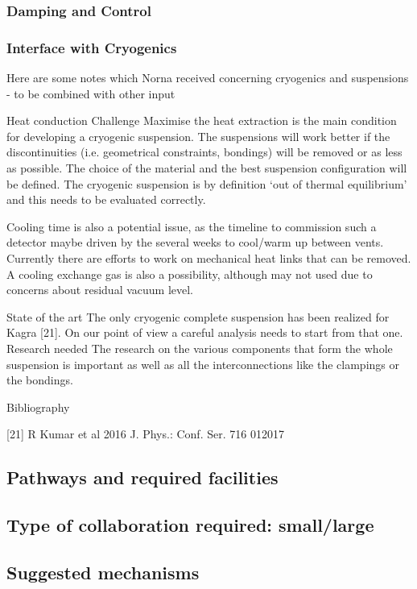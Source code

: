 \subsubsection{Damping and Control}
\subsubsection{Interface with Cryogenics}

Here are some notes which Norna received concerning cryogenics and suspensions - to be combined with other input

Heat conduction
Challenge
Maximise the heat extraction is the main condition for developing a cryogenic suspension. The suspensions will work better if the discontinuities (i.e. geometrical constraints, bondings) will be removed or as less as possible. The choice of the material and the best suspension configuration will be defined. The cryogenic suspension is by definition ‘out of thermal equilibrium’ and this needs to be evaluated correctly.

Cooling time is also a potential issue, as the timeline to commission such a detector maybe driven by the several weeks to cool/warm up between vents. Currently there are efforts to work on mechanical heat links that can be removed. A cooling exchange gas is also a possibility, although may not used due to concerns about residual vacuum level.

State of the art
The only cryogenic complete suspension has been realized for Kagra [21]. On our point of view a careful analysis needs to start from that one.
Research needed
The research on the various components that form the whole suspension is important as well as all the interconnections like the clampings or the bondings. 

Bibliography

[21] R Kumar et al 2016 J. Phys.: Conf. Ser. 716 012017

\subsection{Pathways and required facilities}
\subsection{Type of collaboration required:  small/large}
\subsection{Suggested mechanisms}

